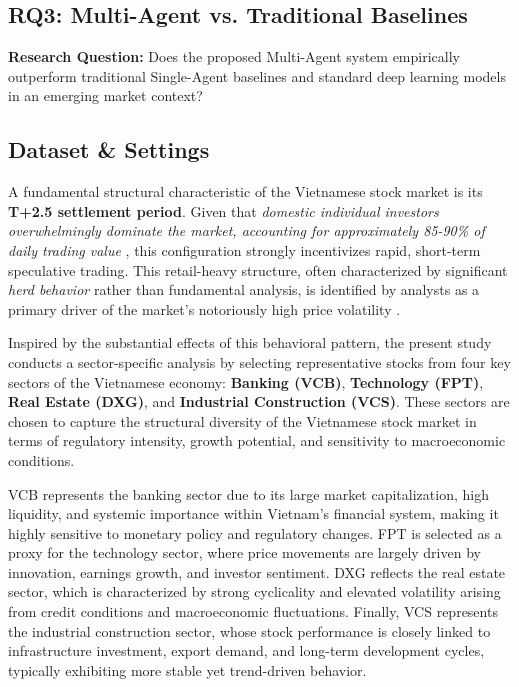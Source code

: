 \documentclass{ieeeaccess}
\begin{document}
\subsection{RQ3: Multi-Agent vs. Traditional Baselines}

\textbf{Research Question:} Does the proposed Multi-Agent system empirically outperform traditional Single-Agent baselines and standard deep learning models in an emerging market context?



\subsection{Dataset \& Settings}
A fundamental structural characteristic of the Vietnamese stock market is its \textbf{T+2.5 settlement period}. Given that \textit{domestic individual investors overwhelmingly dominate the market, accounting for approximately 85-90\% of daily trading value} \cite{TinNhanhChungkhoan2025}, this configuration strongly incentivizes rapid, short-term speculative trading. This retail-heavy structure, often characterized by significant \textit{herd behavior} rather than fundamental analysis, is identified by analysts as a primary driver of the market's notoriously high price volatility \cite{WorldBank2024, Yuanta2025}.



Inspired by the substantial effects of this behavioral pattern, the present study conducts a sector-specific analysis by selecting representative stocks from four key sectors of the Vietnamese economy: \textbf{Banking (VCB)}, \textbf{Technology (FPT)}, \textbf{Real Estate (DXG)}, and \textbf{Industrial Construction (VCS)}. These sectors are chosen to capture the structural diversity of the Vietnamese stock market in terms of regulatory intensity, growth potential, and sensitivity to macroeconomic conditions.

VCB represents the banking sector due to its large market capitalization, high liquidity, and systemic importance within Vietnam’s financial system, making it highly sensitive to monetary policy and regulatory changes. FPT is selected as a proxy for the technology sector, where price movements are largely driven by innovation, earnings growth, and investor sentiment. DXG reflects the real estate sector, which is characterized by strong cyclicality and elevated volatility arising from credit conditions and macroeconomic fluctuations. Finally, VCS represents the industrial construction sector, whose stock performance is closely linked to infrastructure investment, export demand, and long-term development cycles, typically exhibiting more stable yet trend-driven behavior.
\end{document}
